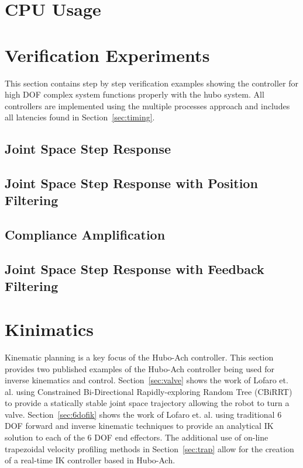 \section{CPU Usage}
	
\section{Verification Experiments}\label{sec:simpleExamples}
This section contains step by step verification examples showing the controller for high DOF complex system functions properly with the hubo system.
All controllers are implemented using the multiple processes approach and includes all latencies found in Section~\ref{sec:timing}.

	\subsection{Joint Space Step Response}\label{sec:singlejointStep}
		
	\subsection{Joint Space Step Response with Position Filtering}\label{sec:singlejointFilter}
		
	\subsection{Compliance Amplification}\label{sec:singlejointRefComplience}
		
	\subsection{Joint Space Step Response with Feedback Filtering}\label{sec:singlejointEnc}
		

\section{Kinimatics}\label{sec:hubo-ach-kinimatics}
Kinematic planning is a key focus of the Hubo-Ach controller.
This section provides two published examples of the Hubo-Ach controller being used for inverse kinematics and control.
Section~\ref{sec:valve} shows the work of Lofaro et. al. \cite{lofaroTePRA2013Valve} using Constrained Bi-Directional Rapidly-exploring Random Tree (CBiRRT) to provide a statically stable joint space trajectory allowing the robot to turn a valve.
Section~\ref{sec:6dofik} shows the work of Lofaro et. al. \cite{lofaroTePRA2013HuboAch} using traditional 6 DOF forward and inverse kinematic techniques to provide an analytical IK solution to each of the 6 DOF end effectors.
The additional use of on-line trapezoidal velocity profiling methods in Section~\ref{sec:trap} allow for the creation of a real-time IK controller based in Hubo-Ach.


